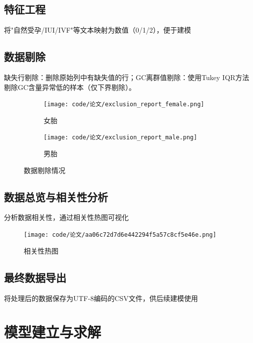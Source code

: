 \documentclass[12pt,a4paper]{ctexart}
\numberwithin{equation}{section}
\theoremstyle{mcm}
\begin{document}
\subsection{特征工程}
将"自然受孕/IUI/IVF"等文本映射为数值（0/1/2），便于建模
\subsection{数据剔除}
缺失行剔除：删除原始列中有缺失值的行；GC离群值剔除：使用Tukey IQR方法剔除GC含量异常低的样本（仅下界剔除）。
\begin{figure}[htbp]
    \centering
    \begin{subfigure}{0.9\textwidth}
        \texttt{[image: code/论文/exclusion\_report\_female.png]}
        \caption{女胎}
    \end{subfigure}
    \hfill
    \begin{subfigure}{0.9\textwidth}
        \texttt{[image: code/论文/exclusion\_report\_male.png]}
        \caption{男胎}
    \end{subfigure}
    \caption{数据剔除情况}
    \label{fig:missing_analysis}
\end{figure}
\subsection{数据总览与相关性分析}
分析数据相关性，通过相关性热图可视化
\begin{figure}[htbp]\centering
    \texttt{[image: code/论文/aa06c72d7d6e442294f5a57c8cf5e46e.png]}
    \caption{相关性热图}
    \label{fig:missing_analysis}
\end{figure}
\subsection{最终数据导出}
将处理后的数据保存为UTF-8编码的CSV文件，供后续建模使用
\section{模型建立与求解}
\end{document}
